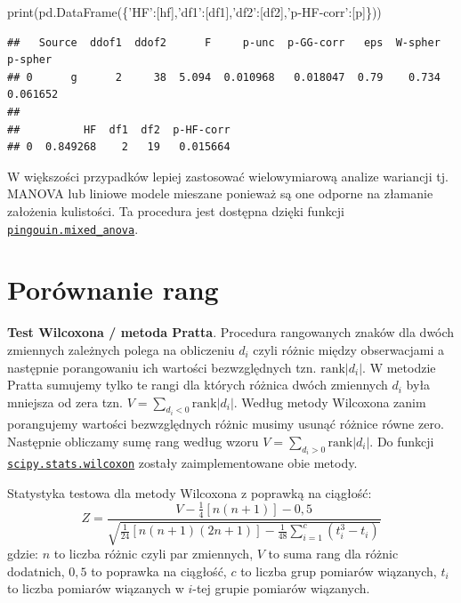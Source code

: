 \documentclass[polish,]{book}
\newenvironment{Shaded}{\begin{snugshade}}{\end{snugshade}}
\newcommand{\BuiltInTok}[1]{#1}
\newcommand{\NormalTok}[1]{#1}
\newcommand{\StringTok}[1]{\textcolor[rgb]{0.31,0.60,0.02}{#1}}
\begin{document}
\begin{Shaded}
\begin{Highlighting}[]
\BuiltInTok{print}\NormalTok{(pd.DataFrame(\{}\StringTok{'HF'}\NormalTok{:[hf],}\StringTok{'df1'}\NormalTok{:[df1],}\StringTok{'df2'}\NormalTok{:[df2],}\StringTok{'p-HF-corr'}\NormalTok{:[p]\}))}
\end{Highlighting}
\end{Shaded}

\begin{verbatim}
##   Source  ddof1  ddof2      F     p-unc  p-GG-corr   eps  W-spher   p-spher
## 0      g      2     38  5.094  0.010968   0.018047  0.79    0.734  0.061652 
## 
##          HF  df1  df2  p-HF-corr
## 0  0.849268    2   19   0.015664
\end{verbatim}

W większości przypadków lepiej zastosować wielowymiarową analize wariancji tj. MANOVA \citep{Obrien1985} lub liniowe modele mieszane \citep{ziel2010} ponieważ są one odporne na złamanie założenia kulistości. Ta procedura jest dostępna dzięki funkcji \href{https://pingouin-stats.org/generated/pingouin.mixed_anova.html\#pingouin.mixed_anova}{\texttt{pingouin.mixed\_anova}}.

\hypertarget{R93}{%
\section{Porównanie rang}\label{R93}}

\textbf{Test Wilcoxona / metoda Pratta}. Procedura rangowanych znaków dla dwóch zmiennych zależnych polega na obliczeniu \(d_i\) czyli różnic między obserwacjami a następnie porangowaniu ich wartości bezwzględnych tzn. \(\mbox{rank}|d_i|\). W metodzie Pratta sumujemy tylko te rangi dla których różnica dwóch zmiennych \(d_i\) była mniejsza od zera tzn.
\(V=\sum_{d_i<0}\mbox{rank}|d_i|\).
Według metody Wilcoxona zanim porangujemy wartości bezwzględnych różnic musimy usunąć różnice równe zero. Następnie obliczamy sumę rang według wzoru \(V=\sum_{d_i>0}\mbox{rank}|d_i|\). Do funkcji
\href{https://docs.scipy.org/doc/scipy/reference/generated/scipy.stats.wilcoxon.html\#scipy.stats.wilcoxon}{\texttt{scipy.stats.wilcoxon}} zostały zaimplementowane obie metody.

Statystyka testowa dla metody Wilcoxona z poprawką na ciągłość:
\begin{equation}
Z=\frac{V-\frac{1}{4}\left[n(n+1)\right]-0,5}{\sqrt{\frac{1}{24}\left[n(n+1)(2n+1)\right]-\frac{1}{48}\sum_{i=1}^{c}(t_i^3-t_i)}}
\label{eq:dep05}
\end{equation}
gdzie: \(n\) to liczba różnic czyli par zmiennych, \(V\) to suma rang dla różnic dodatnich, \(0,5\) to poprawka na ciągłość, \(c\) to liczba grup pomiarów wiązanych, \(t_i\) to liczba pomiarów wiązanych w \(i\)-tej grupie pomiarów wiązanych.
\end{document}
